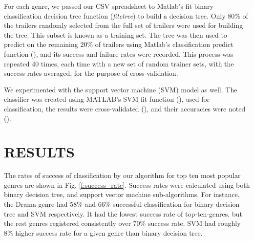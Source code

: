 \documentclass[letterpaper, 10 pt, conference]{ieeeconf}  %
\begin{document}
For each genre, we passed our CSV spreadsheet to Matlab's fit binary classification decision tree function (\textit{fitctree}) to build a decision tree. Only 80\% of the trailers randomly selected from the full set of trailers were used for building the tree. This subset is known as a training set. The tree was then used to predict on the remaining 20\%  of trailers using Matlab's classification predict function (), and its success and failure rates were recorded. This process was repeated 40 times, each time with a new set of random trainer sets, with the success rates averaged, for the purpose of cross-validation.

We experimented with the support vector machine (SVM) model as well. The classifier was created using MATLAB's SVM fit function (), used for classification, the results were cross-validated (), and their accuracies were noted (). 


\section{RESULTS}
The rates of success of classification by our algorithm for top ten most popular genres are shown in Fig. \ref{f:success_rate}. Success rates were calculated using both binary decision tree, and support vector machine sub-algorithms. For instance, the Drama genre had 58\% and 66\% successful classification for binary decision tree and SVM respectively. It had the lowest success rate of top-ten-genres, but the rest genres registered consistently over 70\% success rate. SVM had roughly 8\% higher success rate for a given genre than binary decision tree.
\end{document}
